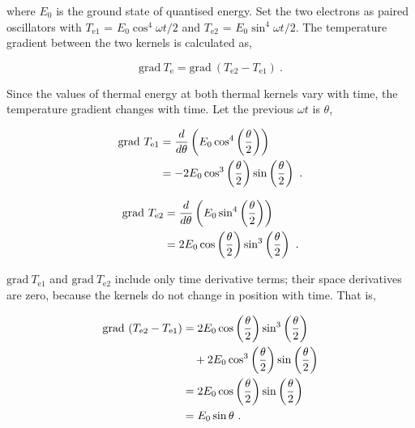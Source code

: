 \documentclass[%
 reprint,
 amsmath,amssymb,
 aps,
]{revtex4-1}
\numberwithin{equation}{section}%
\begin{document}
    \noindent where $E_{0}$ is the ground state of quantised energy. Set the two electrons as paired oscillators with $T_{\mathrm{e1}}$ = $E_{0} \cos^{4} \omega t /2$ and $T_{\mathrm{e2}}$ = $E_{0} \sin^{4} \omega t /2$. The temperature gradient between the two kernels is calculated as,

    \begin{equation}
            \mathrm{grad} \ T_{\mathrm{e}} = \mathrm{grad} \ ( T_{\mathrm{e2}} - T_{\mathrm{e1}} )
            \ .
            \label{e3_k_grad_Te2-Te1}
    \end{equation}

    Since the values of thermal energy at both thermal kernels vary with time, the temperature gradient changes with time. Let the previous $\omega t$ is $\theta$,

        \begin{align}
            \mathrm{grad} \ T_{\mathrm{e1}}
                &= \frac{d}{d \theta} \left( E_{0} \cos^{4} \left( \frac{\theta}{2} \right) \right) \notag \\
                &= - 2 E_{0} \cos^{3} \left( \frac{\theta}{2} \right) \sin \left( \frac{\theta}{2} \right)
                \ .
                \label{e3_gradT_e1}
        \end{align}

        \begin{align}
            \mathrm{grad} \ T_{\mathrm{e2}}
                &= \frac{d}{d \theta} \left( E_{0} \sin^{4} \left( \frac{\theta}{2} \right) \right) \notag \\
                &=   2 E_{0} \cos \left( \frac{\theta}{2} \right) \sin^{3} \left( \frac{\theta}{2} \right)
                \ .
                \label{e3_gradT_e2}
        \end{align}        
 

    $\mathrm{grad} \ T_{\mathrm{e1}}$ and $\mathrm{grad} \ T_{\mathrm{e2}}$ include only time derivative terms; their space derivatives are zero, because the kernels do not change in position with time. That is,

        \begin{align}
            \mathrm{grad} \ (T_{\mathrm{e2}} - T_{\mathrm{e1}})
                &= 2 E_{0} \cos \left( \frac{\theta}{2} \right) \sin^{3} \left( \frac{\theta}{2} \right) \notag \\
                & \quad + 2 E_{0} \cos^{3} \left( \frac{\theta}{2} \right) \sin \left( \frac{\theta}{2} \right) \notag \\
                &= 2 E_{0} \cos \left( \frac{\theta}{2} \right) \sin \left( \frac{\theta}{2} \right) \notag \\
                &= E_{0} \sin \theta
                \ .
            \label{e3_simple_harmonic_motion}
        \end{align}
\end{document}
